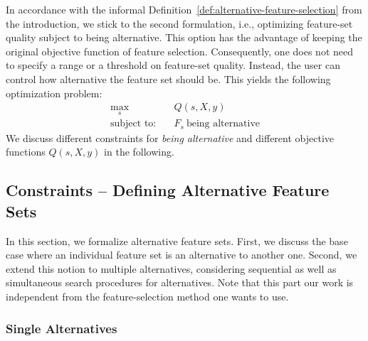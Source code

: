 \documentclass{article}
\theoremstyle{definition}
\begin{document}
In accordance with the informal Definition~\ref{def:alternative-feature-selection} from the introduction, we stick to the second formulation, i.e., optimizing feature-set quality subject to being alternative.
This option has the advantage of keeping the original objective function of feature selection.
Consequently, one does not need to specify a range or a threshold on feature-set quality.
Instead, the user can control how alternative the feature set should be.
This yields the following optimization problem:
%
\begin{align}
	\max_s &\quad Q(s,X,y) \nonumber \\
	\text{subject to:} &\quad F_s~\text{being alternative}
\end{align}
%
We discuss different constraints for \emph{being alternative} and different objective functions $Q(s,X,y)$ in the following.

\subsection{Constraints -- Defining Alternative Feature Sets}
\label{sec:approach:constraints}

In this section, we formalize alternative feature sets.
First, we discuss the base case where an individual feature set is an alternative to another one.
Second, we extend this notion to multiple alternatives, considering sequential as well as simultaneous search procedures for alternatives.
Note that this part our work is independent from the feature-selection method one wants to use.

\subsubsection{Single Alternatives}
\label{sec:approach:constraints:single}
\end{document}
